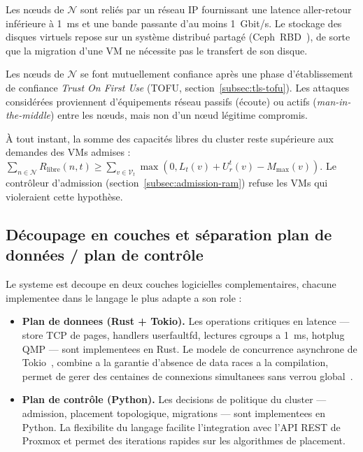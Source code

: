 \begin{hypothese}
    \label{hyp:reseau-stockage}
    Les nœuds de $\mathcal{N}$ sont reliés par un réseau IP fournissant une latence aller-retour inférieure à 1~ms et une bande passante d'au moins 1~Gbit/s. Le stockage des disques virtuels repose sur un système distribué partagé (Ceph~RBD~\cite{ceph_doc}), de sorte que la migration d'une VM ne nécessite pas le transfert de son disque.
\end{hypothese}

\begin{hypothese}
    \label{hyp:confiance}
    Les nœuds de $\mathcal{N}$ se font mutuellement confiance après une phase d'établissement de confiance \emph{Trust On First Use} (TOFU, section~\ref{subsec:tls-tofu}). Les attaques considérées proviennent d'équipements réseau passifs (écoute) ou actifs (\emph{man-in-the-middle}) entre les nœuds, mais non d'un nœud légitime compromis.
\end{hypothese}

\begin{hypothese}
    \label{hyp:capacite-globale}
    À tout instant, la somme des capacités libres du cluster reste supérieure aux demandes des VMs admises : $\sum_{n \in \mathcal{N}} R_{\text{libre}}(n, t) \geq \sum_{v \in \mathcal{V}_t} \max(0, L_t(v) + U_r^t(v) - M_{\max}(v))$. Le contrôleur d'admission (section~\ref{subsec:admission-ram}) refuse les VMs qui violeraient cette hypothèse.
\end{hypothese}

\subsection{Découpage en couches et séparation plan de données / plan de contrôle}
\label{subsec:couches-rust-python}

Le systeme est decoupe en deux couches logicielles complementaires, chacune implementee dans le langage le plus adapte a son role :

\begin{itemize}
    \item \textbf{Plan de donnees (Rust + Tokio).} Les operations critiques en latence --- store TCP de pages, handlers userfaultfd, lectures cgroups a 1~ms, hotplug QMP --- sont implementees en Rust. Le modele de concurrence asynchrone de Tokio~\cite{tokio_doc}, combine a la garantie d'absence de data races a la compilation, permet de gerer des centaines de connexions simultanees sans verrou global~\cite{rust_lang}.
    \item \textbf{Plan de contrôle (Python).} Les decisions de politique du cluster --- admission, placement topologique, migrations --- sont implementees en Python. La flexibilite du langage facilite l'integration avec l'API REST de Proxmox et permet des iterations rapides sur les algorithmes de placement.
\end{itemize}

